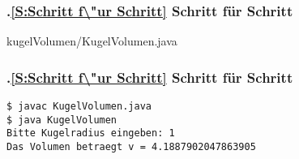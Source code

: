 \def\stitle{Schritt f\"ur Schritt}%
\begin{frame}[t]%
  \frametitle{\kap.\ref{S:Schritt f\"ur Schritt} \stitle}%
\medskip


{kugelVolumen/KugelVolumen.java}

\end{frame}


\def\stitle{Schritt f\"ur Schritt}%
\begin{frame}[fragile]%
  \frametitle{\kap.\ref{S:Schritt f\"ur Schritt} \stitle}%
\medskip

\begin{lstlisting}[title={Um das Programm \code{KugelVolumen} auszuf\"uhren werden folgende Schritte auf dem Terminal durchgef\"uhrt.},style=BASH]
$ javac KugelVolumen.java
$ java KugelVolumen
Bitte Kugelradius eingeben: 1
Das Volumen betraegt v = 4.1887902047863905
\end{lstlisting}

\end{frame}
